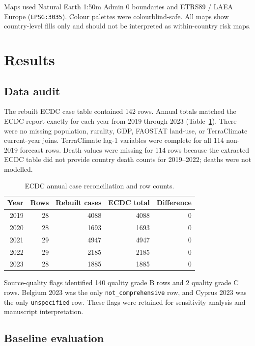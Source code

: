 \documentclass[11pt]{article}
\begin{document}
Maps used Natural Earth 1:50m Admin 0 boundaries and ETRS89 / LAEA Europe (\texttt{EPSG:3035}). Colour palettes were colourblind-safe. All maps show country-level fills only and should not be interpreted as within-country risk maps.

\section{Results}

\subsection{Data audit}

The rebuilt ECDC case table contained 142 rows. Annual totals matched the ECDC report exactly for each year from 2019 through 2023 (Table~\ref{tab:reconciliation}). There were no missing population, rurality, GDP, FAOSTAT land-use, or TerraClimate current-year joins. TerraClimate lag-1 variables were complete for all 114 non-2019 forecast rows. Death values were missing for 114 rows because the extracted ECDC table did not provide country death counts for 2019--2022; deaths were not modelled.

\begin{table}[htbp]
\centering
\caption{ECDC annual case reconciliation and row counts.}
\label{tab:reconciliation}
\begin{tabular}{rrrrr}
\toprule
Year & Rows & Rebuilt cases & ECDC total & Difference \\
\midrule
2019 & 28 & 4088 & 4088 & 0 \\
2020 & 28 & 1693 & 1693 & 0 \\
2021 & 29 & 4947 & 4947 & 0 \\
2022 & 29 & 2185 & 2185 & 0 \\
2023 & 28 & 1885 & 1885 & 0 \\
\bottomrule
\end{tabular}
\end{table}

Source-quality flags identified 140 quality grade B rows and 2 quality grade C rows. Belgium 2023 was the only \texttt{not\_comprehensive} row, and Cyprus 2023 was the only \texttt{unspecified} row. These flags were retained for sensitivity analysis and manuscript interpretation.

\subsection{Baseline evaluation}
\end{document}

